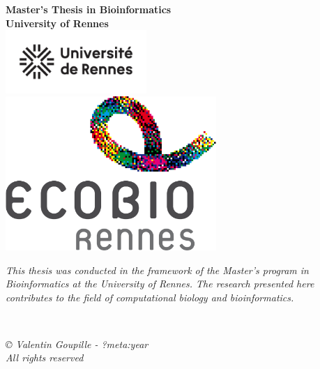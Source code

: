 \documentclass[
  11pt,
  a4paper,
]{report}
\begin{document}
\newpage  %
\thispagestyle{empty}  %
\begin{center}
  {\Huge \textbf{Master's Thesis in Bioinformatics}} \\[2cm]
  {\Large \textbf{University of Rennes}} \\[1cm]
  \includegraphics[width=0.4\textwidth]{figures/rapport/logo_Univ_Rennes.png} \\[1cm]
  \includegraphics[width=0.6\textwidth]{figures/rapport/couverture.png} \\[1cm]
  \begin{minipage}{0.8\textwidth}
    \centering
    \textit{This thesis was conducted in the framework of the Master's program in Bioinformatics at the University of Rennes. The research presented here contributes to the field of computational biology and bioinformatics.}
  \end{minipage} \\[1cm]
  \begin{minipage}{0.8\textwidth}
    \centering
    \small
    \textit{© Valentin Goupille - ?meta:year \\ All rights reserved}
  \end{minipage}
\end{center} 
\end{document}
